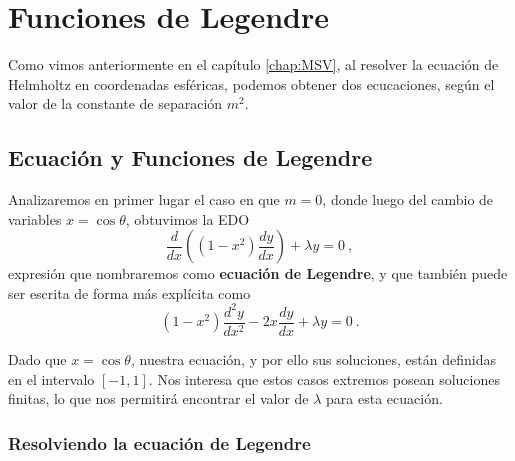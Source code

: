 \chapter{Funciones de Legendre}

Como vimos anteriormente en el capítulo \ref{chap:MSV}, al resolver la ecuación de Helmholtz en coordenadas esféricas, podemos obtener dos ecucaciones, según el valor de la constante de separación $m^2$. 

\section{Ecuación y Funciones de Legendre}

Analizaremos en primer lugar el caso en que $m=0$, donde luego del cambio de variables $x = \cos \theta$, obtuvimos la EDO
\begin{equation}
    \frac{d}{dx}\left( (1-x^2) \frac{dy}{dx} \right) + \lambda y = 0 \ ,
\end{equation}
expresión que nombraremos como \textbf{ecuación de Legendre}, y que también puede ser escrita de forma más explícita como
\begin{equation}\label{eq:legendre_explicit}
    (1-x^2)\frac{d^2y}{dx^2} - 2x \frac{dy}{dx} + \lambda y = 0 \ .
\end{equation}

Dado que $x=\cos\theta$, nuestra ecuación, y por ello sus soluciones, están definidas en el intervalo $[-1,1]$. Nos interesa que estos casos extremos posean soluciones finitas, lo que nos permitirá encontrar el valor de $\lambda$ para esta ecuación.

\subsection{Resolviendo la ecuación de Legendre}


